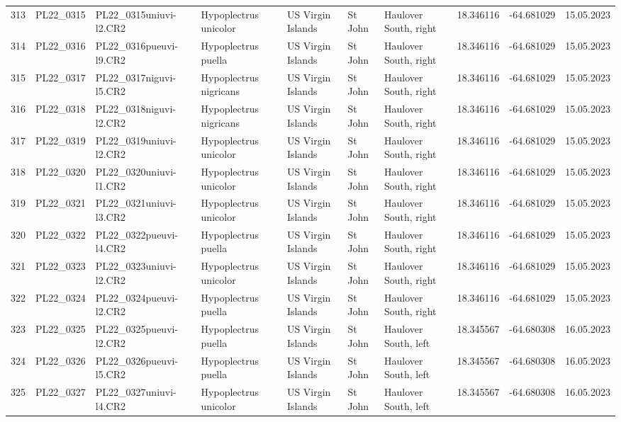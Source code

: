 \begin{table}[ht]
\begin{tabular}{rlllllllll}
  313 & PL22\_0315 & PL22\_0315uniuvi-l2.CR2 & Hypoplectrus unicolor & US Virgin Islands & St John & Haulover South, right & 18.346116 & -64.681029 & 15.05.2023 \\ 
  314 & PL22\_0316 & PL22\_0316pueuvi-l9.CR2 & Hypoplectrus puella & US Virgin Islands & St John & Haulover South, right & 18.346116 & -64.681029 & 15.05.2023 \\ 
  315 & PL22\_0317 & PL22\_0317niguvi-l5.CR2 & Hypoplectrus nigricans & US Virgin Islands & St John & Haulover South, right & 18.346116 & -64.681029 & 15.05.2023 \\ 
  316 & PL22\_0318 & PL22\_0318niguvi-l2.CR2 & Hypoplectrus nigricans & US Virgin Islands & St John & Haulover South, right & 18.346116 & -64.681029 & 15.05.2023 \\ 
  317 & PL22\_0319 & PL22\_0319uniuvi-l2.CR2 & Hypoplectrus unicolor & US Virgin Islands & St John & Haulover South, right & 18.346116 & -64.681029 & 15.05.2023 \\ 
  318 & PL22\_0320 & PL22\_0320uniuvi-l1.CR2 & Hypoplectrus unicolor & US Virgin Islands & St John & Haulover South, right & 18.346116 & -64.681029 & 15.05.2023 \\ 
  319 & PL22\_0321 & PL22\_0321uniuvi-l3.CR2 & Hypoplectrus unicolor & US Virgin Islands & St John & Haulover South, right & 18.346116 & -64.681029 & 15.05.2023 \\ 
  320 & PL22\_0322 & PL22\_0322pueuvi-l4.CR2 & Hypoplectrus puella & US Virgin Islands & St John & Haulover South, right & 18.346116 & -64.681029 & 15.05.2023 \\ 
  321 & PL22\_0323 & PL22\_0323uniuvi-l2.CR2 & Hypoplectrus unicolor & US Virgin Islands & St John & Haulover South, right & 18.346116 & -64.681029 & 15.05.2023 \\ 
  322 & PL22\_0324 & PL22\_0324pueuvi-l2.CR2 & Hypoplectrus puella & US Virgin Islands & St John & Haulover South, right & 18.346116 & -64.681029 & 15.05.2023 \\ 
  323 & PL22\_0325 & PL22\_0325pueuvi-l2.CR2 & Hypoplectrus puella & US Virgin Islands & St John & Haulover South, left & 18.345567 & -64.680308 & 16.05.2023 \\ 
  324 & PL22\_0326 & PL22\_0326pueuvi-l5.CR2 & Hypoplectrus puella & US Virgin Islands & St John & Haulover South, left & 18.345567 & -64.680308 & 16.05.2023 \\ 
  325 & PL22\_0327 & PL22\_0327uniuvi-l4.CR2 & Hypoplectrus unicolor & US Virgin Islands & St John & Haulover South, left & 18.345567 & -64.680308 & 16.05.2023 \\ 

\end{tabular}
\end{table}
